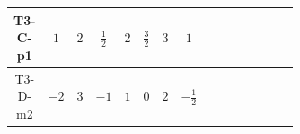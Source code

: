 \documentclass[8pt]{article}
\begin{document}
\begin{landscape}
\begin{longtable}{@{}cccccccc >{\raggedright\arraybackslash}p{0.21\linewidth} >{\raggedright\arraybackslash}p{0.21\linewidth} >{\raggedright\arraybackslash}p{0.21\linewidth}@{}}
T3-C-p1 & $1$ & $2$ & $\frac{1}{2}$ & $2$ & $\frac{3}{2}$ & $3$ & $1$ & \scriptsize\adjustbox{max width=\linewidth}{$\begin{gathered} -S_{1,j_1} S_{1,j_1}{}^{\dagger } m_1^2 \\ +\frac{1}{2} S_{1,j_3} S_{1,j_4} S_{1,j_1}{}^{\dagger } S_{1,j_2}{}^{\dagger } \mathcal{I}_{S_1,j_1,j_3,j_2,j_4}{}^1 \lambda_{S_1}^{(1)}^{(1)}\end{gathered}$} & \scriptsize\adjustbox{max width=\linewidth}{$\begin{gathered} +D_{\mu _1}\left(S_{1,j_1}\right){}^{\dagger } D_{\mu _1}\left(S_{1,j_1}\right)\end{gathered}$} & \scriptsize\adjustbox{max width=\linewidth}{$\begin{gathered} -m_2^2 S_{2,j_1} S_{2,j_1}{}^{\dagger } \\ +\frac{1}{2} S_{2,j_3} S_{2,j_4} S_{2,j_1}{}^{\dagger } S_{2,j_2}{}^{\dagger } \mathcal{I}_{S_2,j_1,j_3,j_2,j_4}{}^1 \lambda_{S_2}^{(1)}^{(1)}\end{gathered}$} \\
\midrule
T3-D-m2 & $-2$ & $3$ & $-1$ & $1$ & $0$ & $2$ & $-\frac{1}{2}$ & \scriptsize\adjustbox{max width=\linewidth}{$\begin{gathered} -S_{1,j_1} S_{1,j_1}{}^{\dagger } m_1^2 \\ +\frac{1}{2} S_{1,j_3} S_{1,j_4} S_{1,j_1}{}^{\dagger } S_{1,j_2}{}^{\dagger } \mathcal{I}_{S_1,j_1,j_3,j_2,j_4}{}^1 \lambda_{S_1}^{(1)}^{(1)} \\ +\frac{1}{2} S_{1,j_3} S_{1,j_4} S_{1,j_1}{}^{\dagger } S_{1,j_2}{}^{\dagger } \mathcal{I}_{S_1,j_1,j_3,j_2,j_4}{}^2 \lambda_{S_1}^{(1)}^{(2)}\end{gathered}$} & \scriptsize\adjustbox{max width=\linewidth}{$\begin{gathered} +D_{\mu _1}\left(S_{1,j_1}\right){}^{\dagger } D_{\mu _1}\left(S_{1,j_1}\right)\end{gathered}$} & \scriptsize\adjustbox{max width=\linewidth}{$\begin{gathered} -m_2^2 S_2 S_2{}^{\dagger } \\ +\frac{1}{2} S_2^2 \left(S_2{}^{\dagger }\right){}^2 \lambda_{S_2}^{(1)}^{(1)}\end{gathered}$} \\
\midrule

\end{longtable}
\end{landscape}
\end{document}
